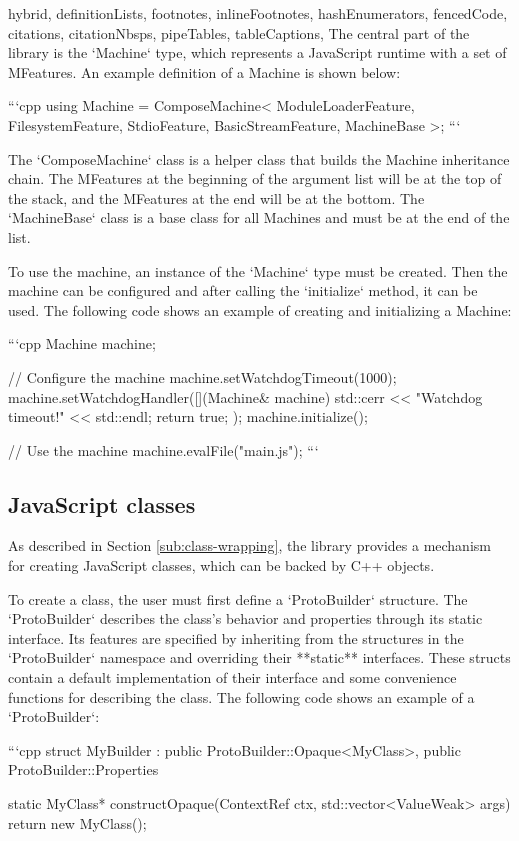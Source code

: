 \begin{markdown*}{%
  hybrid,
  definitionLists,
  footnotes,
  inlineFootnotes,
  hashEnumerators,
  fencedCode,
  citations,
  citationNbsps,
  pipeTables,
  tableCaptions,
}
The central part of the library is the `Machine` type, which represents a JavaScript runtime with a set of MFeatures. An example definition of a Machine is shown below:

```cpp
using Machine = ComposeMachine<
    ModuleLoaderFeature,
    FilesystemFeature,
    StdioFeature,
    BasicStreamFeature,
    MachineBase
>;
```

The `ComposeMachine` class is a helper class that builds the Machine inheritance chain. The MFeatures at the beginning of the argument list will be at the top of the stack, and the MFeatures at the end will be at the bottom. The `MachineBase` class is a base class for all Machines and must be at the end of the list.

To use the machine, an instance of the `Machine` type must be created. Then the machine can be configured and after calling the `initialize` method, it can be used. The following code shows an example of creating and initializing a Machine:

```cpp
Machine machine;

// Configure the machine
machine.setWatchdogTimeout(1000);
machine.setWatchdogHandler([](Machine& machine) {
    std::cerr << "Watchdog timeout!" << std::endl;
    return true;
});
machine.initialize();

// Use the machine
machine.evalFile("main.js");
```


\subsection{JavaScript classes}

As described in Section \ref{sub:class-wrapping}, the library provides a mechanism for creating JavaScript classes, which can be backed by C++ objects.

To create a class, the user must first define a `ProtoBuilder` structure. The `ProtoBuilder` describes the class's behavior and properties through its static interface. Its features are specified by inheriting from the structures in the `ProtoBuilder` namespace and overriding their **static** interfaces. These structs contain a default implementation of their interface and some convenience functions for describing the class. The following code shows an example of a `ProtoBuilder`:

```cpp
struct MyBuilder : public ProtoBuilder::Opaque<MyClass>, public ProtoBuilder::Properties {
  static MyClass* constructOpaque(ContextRef ctx, std::vector<ValueWeak> args) {
    return new MyClass();
  }

}
\end{markdown*}
